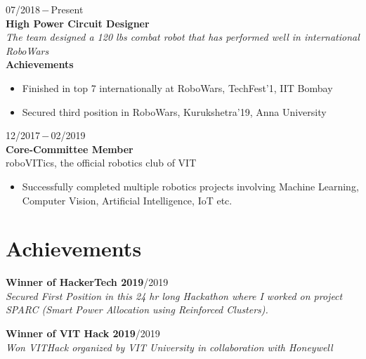 \documentclass[a4paper, 12pt]{article}
\begin{document}
    \begin{flushleft}
        07/2018\,$-$\,Present\\
        \textbf{High Power Circuit Designer}\\
        \textit{The team designed a 120 lbs combat robot that has performed well in international RoboWars}\\\textbf{Achievements}\\\begin{itemize}
            \item Finished in top 7 internationally at RoboWars, TechFest'1, IIT Bombay\\
            \item Secured third position in RoboWars, Kurukshetra'19, Anna University
        \end{itemize}
    \end{flushleft}
    
    \begin{flushleft}
        12/2017\,$-$\,02/2019\\
        \textbf{Core-Committee Member}\\
        roboVITics, the official robotics club of VIT
        \begin{itemize}
            \item Successfully completed multiple robotics projects involving Machine Learning, Computer Vision, Artificial Intelligence, IoT etc.
        \end{itemize}
    \end{flushleft}
	
	\section*{Achievements}
	\begin{flushleft}
		\textbf{Winner of HackerTech 2019}\qquad\qquad\qquad\qquad\qquad\qquad\qquad\qquad\qquad\qquad\quad{}/2019\\\textit{Secured First Position in this 24 hr long Hackathon where I worked on project\\SPARC (Smart Power Allocation using Reinforced Clusters).}
	\end{flushleft}
	
	\begin{flushleft}
		\textbf{Winner of VIT Hack 2019}\qquad\qquad\qquad\qquad\qquad\qquad\qquad\qquad\qquad\qquad\qquad{}/2019\\\textit{Won VITHack organized by VIT University in collaboration with Honeywell}
	\end{flushleft}
\end{document}
